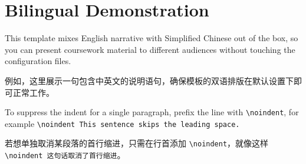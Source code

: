 \section{Bilingual Demonstration}

This template mixes English narrative with Simplified Chinese out of the box, so you can present coursework material to different audiences without touching the configuration files.

例如，这里展示一句包含中英文的说明语句，确保模板的双语排版在默认设置下即可正常工作。

To suppress the indent for a single paragraph, prefix the line with \texttt{\textbackslash noindent}, for example \texttt{\textbackslash noindent This sentence skips the leading space.}

\noindent 若想单独取消某段落的首行缩进，只需在行首添加 \texttt{\textbackslash noindent}，就像这样 \texttt{\textbackslash noindent 这句话取消了首行缩进}。
